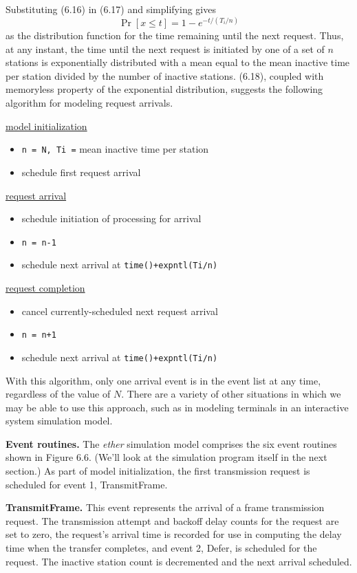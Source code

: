 Substituting (6.16) in (6.17) and simplifying gives
\begin{equation} \Pr[x\le t]=1-e^{-t/(T_i/n)} \end{equation}
as the distribution function for the time remaining until the next request. Thus, at any instant, the time until the next request is initiated by one of a set of $n$ stations is exponentially distributed with a mean equal to the mean inactive time per station divided by the number of inactive stations. (6.18), coupled with memoryless property of the exponential distribution, suggests the following algorithm for modeling request arrivals.

\noindent\underline{model initialization}
\begin{itemize}
\item \texttt{n = N, Ti =} mean inactive time per station
\item schedule first request arrival
\end{itemize}
\noindent\underline{request arrival}
\begin{itemize}
\item schedule initiation of processing for arrival
\item \texttt{n = n-1}
\item schedule next arrival at \texttt{time()+expntl(Ti/n)}
\end{itemize}
\noindent\underline{request completion}
\begin{itemize}
\item cancel currently-scheduled next request arrival
\item \texttt{n = n+1}
\item schedule next arrival at \texttt{time()+expntl(Ti/n)}
\end{itemize}
With this algorithm, only one arrival event is in the event list at any time, regardless of the value of $N$. There are a variety of other situations in which we may be able to use this approach, such as in modeling terminals in an interactive system simulation model.

\noindent\textbf{Event routines.} The \emph{ether} simulation model comprises the six event routines shown in Figure 6.6. (We'll look at the simulation program itself in the next section.) As part of model initialization, the first transmission request is scheduled for event 1, TransmitFrame.

\noindent\textbf{TransmitFrame.} This event represents the arrival of a frame transmission request. The transmission attempt and backoff delay counts for the request are set to zero, the request's arrival time is recorded for use in computing the delay time when the transfer completes, and event 2, Defer, is scheduled for the request. The inactive station count is decremented and the next arrival scheduled.

